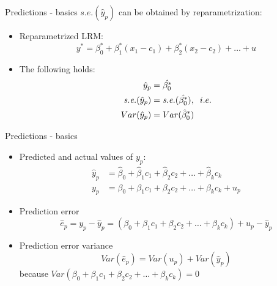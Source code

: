 \documentclass{beamer}
\begin{document}

\begin{frame}{Predictions - basics}
$\textit{s.e.}(\hat{y}_p)$ can be obtained by reparametrization:

\vspace{0.5cm}
\begin{itemize}
\item Reparametrized LRM:
$$y^*=\beta^*_0 + \beta^*_1 (x_1 -c_1) + \beta^*_2(x_2 - c_2) + \dots + u$$
\item The following holds:
\begin{align} \nonumber
 \hat{y}_p &= \hat{\beta_0^*} \\ \nonumber
 \textit{s.e.}(\hat{y}_p ) &= 
   \textit{s.e.}(\hat{\beta_0^*}), \hspace{0.2cm} i.e. \\ \nonumber
 Var(\hat{y}_p) &= Var(\hat{\beta}_0^*)
\end{align} 
\end{itemize}
\end{frame}


\begin{frame}{Predictions - basics}
\begin{itemize}
\item Predicted and actual values of $y_p$:
\begin{align}\nonumber
\hat{y}_p &  = \hat{\beta}_0 + \hat{\beta}_1 c_1 + \hat{\beta}_2 c_2 + \dots + \hat{\beta}_k c_k\\ \nonumber
y_p & = \beta_0 + \beta_1 c_1 + \beta_2 c_2 + \dots+\beta_k c_k + u_p \nonumber
\end{align} 
\item Prediction error
$$\hat{e}_p = y_p - \hat{y}_p = (\beta_0 + \beta_1 c_1 + \beta_2 c_2 + \dots+\beta_k c_k) + u_p - \hat{y}_p$$
\item Prediction error variance
$$Var(\hat{e}_p) = Var(u_p) + Var(\hat{y}_p)$$
because $Var(\beta_0 + \beta_1 c_1 + \beta_2 c_2 + \dots+\beta_k c_k)=0$
\end{itemize}
\end{frame}

\end{document}
